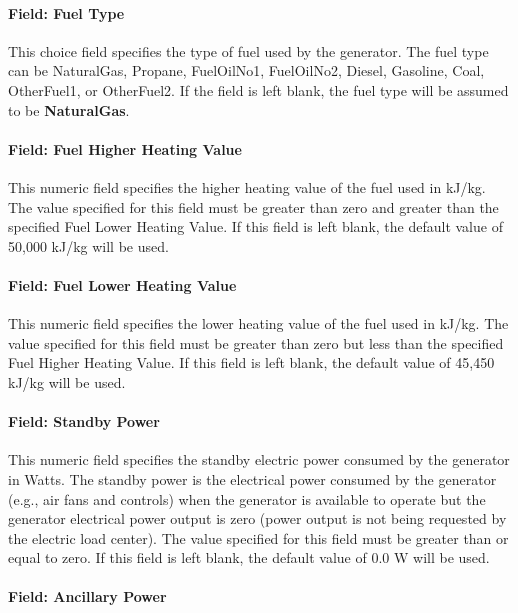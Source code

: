 \paragraph{Field: Fuel Type}\label{field-fuel-type-2}

This choice field specifies the type of fuel used by the generator. The fuel type can be NaturalGas, Propane, FuelOilNo1, FuelOilNo2, Diesel, Gasoline, Coal, OtherFuel1, or OtherFuel2. If the field is left blank, the fuel type will be assumed to be \textbf{NaturalGas}.

\paragraph{Field: Fuel Higher Heating Value}\label{field-fuel-higher-heating-value-2}

This numeric field specifies the higher heating value of the fuel used in kJ/kg. The value specified for this field must be greater than zero and greater than the specified Fuel Lower Heating Value. If this field is left blank, the default value of 50,000 kJ/kg will be used.

\paragraph{Field: Fuel Lower Heating Value}\label{field-fuel-lower-heating-value}

This numeric field specifies the lower heating value of the fuel used in kJ/kg. The value specified for this field must be greater than zero but less than the specified Fuel Higher Heating Value. If this field is left blank, the default value of 45,450 kJ/kg will be used.

\paragraph{Field: Standby Power}\label{field-standby-power}

This numeric field specifies the standby electric power consumed by the generator in Watts. The standby power is the electrical power consumed by the generator (e.g., air fans and controls) when the generator is available to operate but the generator electrical power output is zero (power output is not being requested by the electric load center). The value specified for this field must be greater than or equal to zero. If this field is left blank, the default value of 0.0 W will be used.

\paragraph{Field: Ancillary Power}\label{field-ancillary-power}

